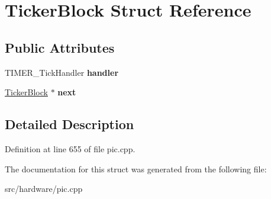\hypertarget{structTickerBlock}{\section{Ticker\-Block Struct Reference}
\label{structTickerBlock}
}
\subsection*{Public Attributes}
\begin{DoxyCompactItemize}
\item 
\hypertarget{structTickerBlock_a988263e8ab525b52670e556aece5f427}{T\-I\-M\-E\-R\-\_\-\-Tick\-Handler {\bfseries handler}}\label{structTickerBlock_a988263e8ab525b52670e556aece5f427}

\item 
\hypertarget{structTickerBlock_a291819bf28ca00f5d7c0a26d1f771e8b}{\hyperlink{structTickerBlock}{Ticker\-Block} $\ast$ {\bfseries next}}\label{structTickerBlock_a291819bf28ca00f5d7c0a26d1f771e8b}

\end{DoxyCompactItemize}


\subsection{Detailed Description}


Definition at line 655 of file pic.\-cpp.



The documentation for this struct was generated from the following file\-:\begin{DoxyCompactItemize}
\item 
src/hardware/pic.\-cpp\end{DoxyCompactItemize}
